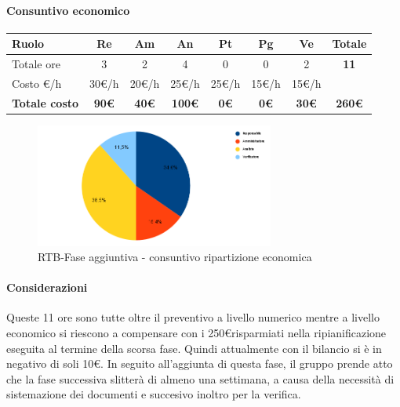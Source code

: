 \paragraph{Consuntivo economico}
\begin{center}
	\renewcommand{\arraystretch}{1.8}
	\begin{tabular}{ |m{6em}|c|c|c|c|c|c|c| }
	\hline
	\textbf{Ruolo} & \textbf{Re} & \textbf{Am} &  \textbf{An} &  \textbf{Pt} &  \textbf{Pg} &  \textbf{Ve} &  \textbf{Totale}\\
    \hline
    Totale ore & 3 & 2 & 4 & 0 & 0 & 2 & \textbf{11}\\
    \hline
    Costo \euro/h & 30\euro/h & 20\euro/h & 25\euro/h & 25\euro/h & 15\euro/h & 15\euro/h & \\
    \hline
    \textbf{Totale costo} & \textbf{90\euro} & \textbf{40\euro} &  \textbf{100\euro} &  \textbf{0\euro} &  \textbf{0\euro} &  \textbf{30\euro} &  \textbf{260\euro}\\
    \hline
	\end{tabular}
    \begin{figure}[H]
        \centering\includegraphics[width=0.7\textwidth, height=0.7\textheight, keepaspectratio]{images/consuntivo/RTB-fase-aggiuntiva-costo.png}
        \caption{RTB-Fase aggiuntiva - consuntivo ripartizione economica}
    \end{figure}
\end{center}

\paragraph{Considerazioni} \hfill \break
Queste 11 ore sono tutte oltre il preventivo a livello numerico mentre a livello economico si riescono a compensare con i 250\euro risparmiati nella ripianificazione eseguita al termine della scorsa fase.
Quindi attualmente con il bilancio si è in negativo di soli 10\euro. 
\newline In seguito all'aggiunta di questa fase, il gruppo prende atto che la fase successiva slitterà di almeno una settimana, a causa della necessità di sistemazione dei documenti e succesivo inoltro per la verifica. 